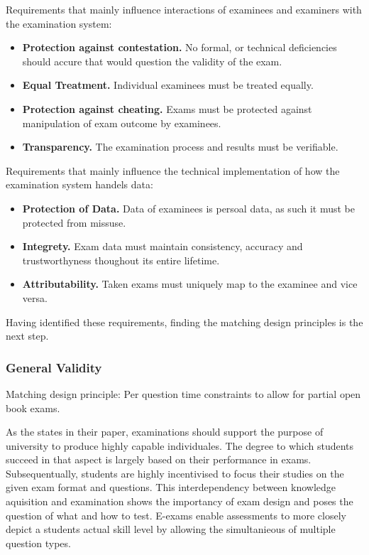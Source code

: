 Requirements that mainly influence interactions of examinees and
examiners with the examination system:

\begin{itemize}
\item
  \textbf{Protection against contestation.} No formal, or technical
  deficiencies should accure that would question the validity of the
  exam.
\item
  \textbf{Equal Treatment.} Individual examinees must be treated
  equally.
\item
  \textbf{Protection against cheating.} Exams must be protected against
  manipulation of exam outcome by examinees.
\item
  \textbf{Transparency.} The examination process and results must be
  verifiable.
\end{itemize}

Requirements that mainly influence the technical implementation of how
the examination system handels data:

\begin{itemize}
\item
  \textbf{Protection of Data.} Data of examinees is persoal data, as
  such it must be protected from missuse.
\item
  \textbf{Integrety.} Exam data must maintain consistency, accuracy and
  trustworthyness thoughout its entire lifetime.
\item
  \textbf{Attributability.} Taken exams must uniquely map to the
  examinee and vice versa.
\end{itemize}

Having identified these requirements, finding the matching design
principles is the next step.

\hypertarget{general-validity}{%
\subsubsection{General Validity}\label{general-validity}}

Matching design principle: Per question time constraints to allow for
partial open book exams.

As the states in their paper, examinations should support the purpose of
university to produce highly capable individuales. The degree to which
students succeed in that aspect is largely based on their performance in
exams. Subsequentually, students are highly incentivised to focus their
studies on the given exam format and questions. This interdependency
between knowledge aquisition and examination shows the importancy of
exam design and poses the question of what and how to test. E-exams
enable assessments to more closely depict a students actual skill level
by allowing the simultanieous of multiple question types.

